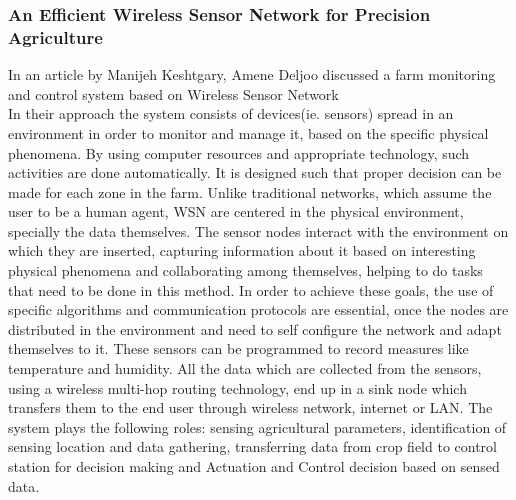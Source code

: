 \documentclass[12pt, a4paper]{article}
\begin{document}
\subsubsection{An Efficient Wireless Sensor Network for Precision Agriculture}
In an article by Manijeh Keshtgary, Amene Deljoo \cite{keshtgary2012efficient} discussed a farm monitoring and control system based on Wireless Sensor Network\\
In their approach the system consists of devices(ie. sensors) spread in an environment in order to monitor and manage it, based on the specific physical phenomena. By using computer resources and appropriate technology, such activities are done automatically. It is designed such that proper decision can be made for each zone in the farm. Unlike traditional networks, which assume the user to be a human agent, WSN are centered in the physical environment, specially the data themselves. The sensor nodes interact with the environment on which they are inserted, capturing information about it based on interesting physical phenomena and collaborating among themselves, helping to do tasks that need to be done in this method. In order to achieve these goals, the use of specific algorithms and communication protocols are essential, once the nodes are distributed in the environment and need to self configure the network and adapt themselves to it. These sensors can be programmed to record measures like temperature and humidity. All the data which are collected from the sensors, using a wireless multi-hop routing technology, end up in a sink node which transfers them to the end user through wireless network, internet or LAN. The system plays the following roles: sensing agricultural parameters, identification of sensing location and data gathering, transferring data from crop field to control station for decision making and Actuation and Control decision based on sensed data.
\end{document}
